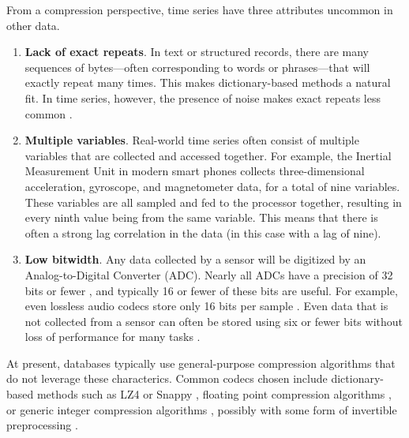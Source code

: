 
From a compression perspective, time series have three attributes uncommon in other data.

\begin{enumerate}
    \item \textbf{Lack of exact repeats}. In text or structured records, there are many sequences of bytes---often corresponding to words or phrases---that will exactly repeat many times. This makes dictionary-based methods a natural fit. In time series, however, the presence of noise makes exact repeats less common \cite{extract}.
    \item \textbf{Multiple variables}. Real-world time series often consist of multiple variables that are collected and accessed together. For example, the Inertial Measurement Unit in modern smart phones collects three-dimensional acceleration, gyroscope, and magnetometer data, for a total of nine variables. These variables are all sampled and fed to the processor together, resulting in every ninth value being from the same variable. This means that there is often a strong lag correlation in the data (in this case with a lag of nine). %
    \item \textbf{Low bitwidth}. Any data collected by a sensor will be digitized by an Analog-to-Digital Converter (ADC). Nearly all ADCs have a precision of 32 bits or fewer \cite{digikeyADCs}, and typically 16 or fewer of these bits are useful. For example, even lossless audio codecs store only 16 bits per sample \cite{flac, shorten}. Even data that is not collected from a sensor can often be stored using six or fewer bits without loss of performance for many tasks \cite{epenthesis, SAX}.
\end{enumerate}


At present, databases typically use general-purpose compression algorithms that do not leverage these characterics. Common codecs chosen include dictionary-based methods such as LZ4 \cite{lz4} or Snappy \cite{snappy}, floating point compression algorithms \cite{gorilla}, or generic integer compression algorithms \cite{influxDB, simple8b}, possibly with some form of invertible preprocessing \cite{influxDB, gorilla, berkeleyTreeDB}.

